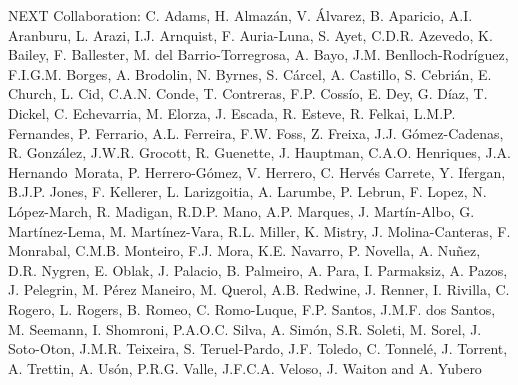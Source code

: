 NEXT Collaboration: C. Adams, H. Almaz\'an, V. \'Alvarez, B. Aparicio, A.I. Aranburu, L. Arazi, I.J. Arnquist, F. Auria-Luna, S. Ayet, C.D.R. Azevedo, K. Bailey, F. Ballester, M. del Barrio-Torregrosa, A. Bayo, J.M. Benlloch-Rodr\'{i}guez, F.I.G.M. Borges, A. Brodolin, N. Byrnes, S. C\'arcel, A. Castillo, S. Cebri\'an, E. Church, L. Cid, C.A.N. Conde, T. Contreras, F.P. Coss\'io, E. Dey, G. D\'iaz, T. Dickel, C. Echevarria, M. Elorza, J. Escada, R. Esteve, R. Felkai, L.M.P. Fernandes, P. Ferrario, A.L. Ferreira, F.W. Foss, Z. Freixa, J.J. G\'omez-Cadenas, R. Gonz\'alez, J.W.R. Grocott, R. Guenette, J. Hauptman, C.A.O. Henriques, J.A. Hernando~Morata, P. Herrero-G\'omez, V. Herrero, C. Herv\'es Carrete, Y. Ifergan, B.J.P. Jones, F. Kellerer, L. Larizgoitia, A. Larumbe, P. Lebrun, F. Lopez, N. L\'opez-March, R. Madigan, R.D.P. Mano, A.P. Marques, J. Mart\'in-Albo, G. Mart\'inez-Lema, M. Mart\'inez-Vara, R.L. Miller, K. Mistry, J. Molina-Canteras, F. Monrabal, C.M.B. Monteiro, F.J. Mora, K.E. Navarro, P. Novella, A. Nu\~{n}ez, D.R. Nygren, E. Oblak, J. Palacio, B. Palmeiro, A. Para, I. Parmaksiz, A. Pazos, J. Pelegrin, M. P\'erez Maneiro, M. Querol, A.B. Redwine, J. Renner, I. Rivilla, C. Rogero, L. Rogers, B. Romeo, C. Romo-Luque, F.P. Santos, J.M.F. dos Santos, M. Seemann, I. Shomroni, P.A.O.C. Silva, A. Sim\'on, S.R. Soleti, M. Sorel, J. Soto-Oton, J.M.R. Teixeira, S. Teruel-Pardo, J.F. Toledo, C. Tonnel\'e, J. Torrent, A. Trettin, A. Us\'on, P.R.G. Valle, J.F.C.A. Veloso, J. Waiton and A. Yubero